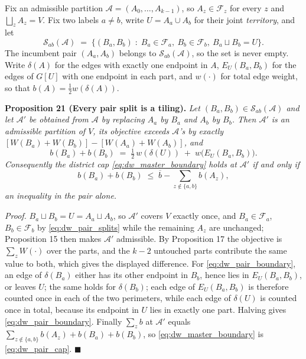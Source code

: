 \documentclass{article}
\begin{document}
Fix an admissible partition $\mathcal A = (A_0, \dots, A_{k-1})$, so
$A_z \in \mathcal F_z$ for every $z$ and $\bigsqcup_z A_z = V$. Fix two labels
$a \neq b$, write $U = A_a \cup A_b$ for their joint \emph{territory}, and let
\begin{equation}\label{eq:dw_pair_splits}
\mathcal S_{ab}(\mathcal A) \;=\;
\big\{ (B_a, B_b) \;:\; B_a \in \mathcal F_a,\ B_b \in \mathcal F_b,\
B_a \sqcup B_b = U \big\} .
\end{equation}
The incumbent pair $(A_a, A_b)$ belongs to $\mathcal S_{ab}(\mathcal A)$, so the
set is never empty. Write $\delta(A)$ for the edges with exactly one endpoint in
$A$, $E_U(B_a, B_b)$ for the edges of $G[U]$ with one endpoint in each part, and
$w(\cdot)$ for total edge weight, so that $b(A) = \tfrac12 w(\delta(A))$.

\noindent\textbf{Proposition 21 (Every pair split is a tiling).} \textit{Let
$(B_a, B_b) \in \mathcal S_{ab}(\mathcal A)$ and let $\mathcal A'$ be obtained
from $\mathcal A$ by replacing $A_a$ by $B_a$ and $A_b$ by $B_b$. Then
$\mathcal A'$ is an admissible partition of $V$, its objective exceeds
$\mathcal A$'s by exactly
$[W(B_a) + W(B_b)] - [W(A_a) + W(A_b)]$, and}
\begin{equation}\label{eq:dw_pair_boundary}
b(B_a) + b(B_b) \;=\; \tfrac12\, w(\delta(U)) \;+\; w\big(E_U(B_a, B_b)\big) .
\end{equation}
\textit{Consequently the district cap \eqref{eq:dw_master_boundary} holds at
$\mathcal A'$ if and only if}
\begin{equation}\label{eq:dw_pair_cap}
b(B_a) + b(B_b) \;\leq\; \overline b - \sum_{z \notin \{a, b\}} b(A_z) ,
\end{equation}
\textit{an inequality in the pair alone.}

\textit{Proof.} $B_a \sqcup B_b = U = A_a \sqcup A_b$, so $\mathcal A'$ covers
$V$ exactly once, and $B_a \in \mathcal F_a$, $B_b \in \mathcal F_b$ by
\eqref{eq:dw_pair_splits} while the remaining $A_z$ are unchanged; Proposition
15 then makes $\mathcal A'$ admissible. By Proposition 17 the objective is
$\sum_z W(\cdot)$ over the parts, and the $k - 2$ untouched parts contribute the
same value to both, which gives the displayed difference. For
\eqref{eq:dw_pair_boundary}, an edge of $\delta(B_a)$ either has its other
endpoint in $B_b$, hence lies in $E_U(B_a, B_b)$, or leaves $U$; the same holds
for $\delta(B_b)$; each edge of $E_U(B_a, B_b)$ is therefore counted once in
each of the two perimeters, while each edge of $\delta(U)$ is counted once in
total, because its endpoint in $U$ lies in exactly one part. Halving gives
\eqref{eq:dw_pair_boundary}. Finally $\sum_z b$ at $\mathcal A'$ equals
$\sum_{z \notin \{a,b\}} b(A_z) + b(B_a) + b(B_b)$, so
\eqref{eq:dw_master_boundary} is \eqref{eq:dw_pair_cap}. $\blacksquare$
\end{document}
